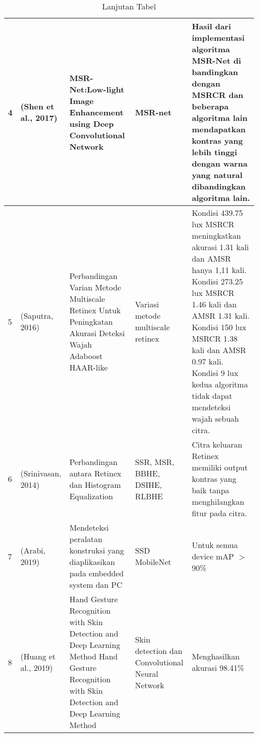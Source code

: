 \begin{table}[htpb]
	\caption{Lanjutan Tabel}
	\label{labelku}
	\vspace{0.2cm}
	\begin{tabular}{|p{0.5cm}|p{2cm}|p{3cm}|p{3cm}|p{4cm}|}
		\hline
		4 & (Shen et al., 2017) & MSR-Net:Low-light Image Enhancement using Deep Convolutional Network & MSR-net & Hasil dari implementasi algoritma MSR-Net di bandingkan dengan MSRCR dan beberapa algoritma lain mendapatkan kontras yang lebih tinggi dengan warna yang natural dibandingkan algoritma lain.\\
		\hline
		5 & (Saputra, 2016) & Perbandingan Varian Metode Multiscale Retinex Untuk Peningkatan Akurasi Deteksi Wajah Adaboost HAAR-like & Variasi metode multiscale retinex & Kondisi 439.75 lux MSRCR meningkatkan akurasi 1.31 kali dan
		AMSR hanya 1,11 kali.
		Kondisi 273.25 lux MSRCR 1.46 kali dan AMSR 1.31 kali.
		Kondisi 150 lux 
		MSRCR 1.38 kali dan AMSR 0.97 kali. 
		Kondisi 9 lux kedua algoritma tidak dapat mendeteksi wajah sebuah citra.\\
		\hline	
		
		6 & (Srinivasan, 2014) & Perbandingan antara Retinex dan Histogram Equalization & SSR, MSR, BBHE, DSIHE, RLBHE & Citra keluaran Retinex memiliki output kontras yang baik tanpa menghilangkan fitur pada citra. \\
		\hline	
		7 & (Arabi, 2019) & Mendeteksi peralatan konstruksi yang diaplikasikan pada embedded system dan PC & SSD MobileNet & Untuk semua device mAP $>$ 90\% \\
		\hline
		8& (Huang et al., 2019) &Hand Gesture Recognition with Skin Detection and Deep Learning Method Hand Gesture Recognition with Skin Detection and Deep Learning Method& Skin detection dan Convolutional Neural Network & Menghasilkan akurasi 98.41\% \\
		\hline
	\end{tabular}
\end{table}

